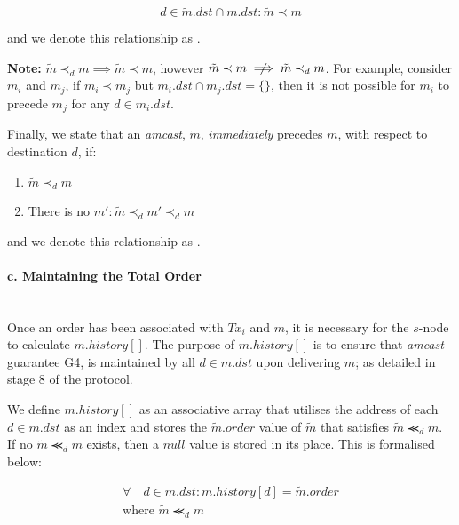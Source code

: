 \begin{enumerate}
        \begin{equation*}
            d \in \tilde{m}.dst \cap m.dst : \tilde{m} \prec m
        \end{equation*}
        
        and we denote this relationship as  .  
        
        \textbf{Note: } $\tilde{m} \prec_d m \implies  \tilde{m} \prec m$, however $\tilde{m} \prec m \centernot\implies \tilde{m} \prec_d m$.  For example, consider $m_i$ and $m_j$, if $m_i \prec m_j$ but $m_i.dst \cap m_j.dst = \{\}$, then it is not possible for $m_i$ to precede $m_j$ for any $d \in m_i.dst$.  
        
        Finally, we state that an \emph{amcast}, $\tilde{m}$, \emph{immediately} precedes $m$, with respect to destination $d$, if:

        \begin{enumerate}[label={(\roman*)}, leftmargin=5em]
            \item    $\tilde{m} \prec_d m$
            \item    There is no $m' : \tilde{m} \prec_d m' \prec_d m$
        \end{enumerate}
        
        and we denote this relationship as .  
        
        \paragraph{c. Maintaining the Total Order} \hfill \\
         Once an order has been associated with $Tx_i$ and $m$, it is necessary for the $s$-node to calculate $m.history[]$.  The purpose of $m.history[]$ is to ensure that \emph{amcast} guarantee G4, is maintained by all $d \in m.dst$ upon delivering $m$; as detailed in stage $8$ of the protocol.  
         
         We define $m.history[]$ as an associative array that utilises the address of each $d \in m.dst$ as an index and stores the $\tilde{m}.order$ value of $\tilde{m}$ that satisfies $\tilde{m} \llcurly_d m$.  If no $\tilde{m} \llcurly_d m$ exists, then a $null$ value is stored in its place.  This is formalised below:
         
         \begin{equation*}
             \begin{split}
	             \forall \quad d \in m.dst : m.history[d] = \tilde{m}.order \\
	             \text{where } \tilde{m} \llcurly_d m
             \end{split}
         \end{equation*}
         

\end{enumerate}
